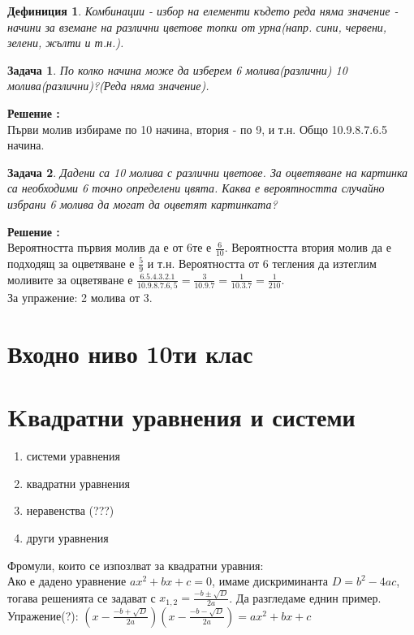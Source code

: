 \documentclass{article}
\newtheorem{definition}{Дефиниция}
\newtheorem{problem}{Задача}
\newcounter{solution}
\newcommand\solution{%
	\stepcounter{solution}%
	\textbf{Решение :}\\%
}
\begin{document}
\begin{definition}
	Комбинации - избор на елементи където реда няма значение - начини за вземане на различни цветове топки от урна(напр. сини, червени, зелени, жълти и т.н.).
\end{definition}

\begin{problem}
По колко начина може да изберем 6 молива(различни) 10 молива(различни)?(Реда няма значение).
\end{problem}
\solution Първи молив избираме по 10 начина, втория - по 9, и т.н. Общо 10.9.8.7.6.5 начина.



\begin{problem}
	Дадени са 10 молива с различни цветове. За оцветяване на картинка са необходими 6 точно определени цвята. Каква е вероятността случайно избрани 6 молива да могат да оцветят картинката?
\end{problem}
\solution
Вероятността първия молив да е от 6те е $\frac{6}{10}$. Вероятността втория молив да е подходящ за оцветяване е  $\frac{5}{9}$ и т.н. Вероятността от 6 тегления да изтеглим моливите за оцветяване е $\frac{6.5.4.3.2.1}{10.9.8.7.6,5} = \frac{3}{10.9.7} = \frac{1}{10.3.7} = \frac{1}{210}$. \\
За упражение: 2 молива от 3.




	\section{Входно ниво 10ти клас}
	
	\section{Kвадратни уравнения и системи}
	
		
	\begin{enumerate}
		\item системи уравнения
		\item квадратни уравнения
		\item неравенства (???)
		\item други уравнения
	\end{enumerate}
	
	
	
	Фромули, които се изпозлват за квадратни уравния: \\
	Ако е дадено уравнение $ax^2 + bx + c = 0  $, имаме дискриминанта  $ D= b^2 - 4ac $, тогава решенията се задават с $ x_{1,2} = \frac{-b \pm \sqrt{D}  }{2a}$. Да разгледаме еднин пример. 
	Упражение(?): $(x - \frac{-b + \sqrt{D}  }{2a}  )(x - \frac{-b - \sqrt{D}  }{2a}) = ax^2 + bx +c $
\end{document}
